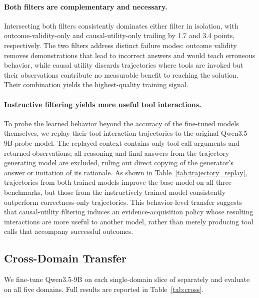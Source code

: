 \paragraph{Both filters are complementary and necessary.}
Intersecting both filters consistently dominates either filter in isolation, with outcome-validity-only and causal-utility-only trailing by 1.7 and 3.4 points, respectively.
The two filters address distinct failure modes: outcome validity removes demonstrations that lead to incorrect answers and would teach erroneous behavior, while causal utility discards trajectories where tools are invoked but their observations contribute no measurable benefit to reaching the solution. Their combination yields the highest-quality training signal.


\paragraph{Instructive filtering yields more useful tool interactions.}
To probe the learned behavior beyond the accuracy of the fine-tuned models themselves, we replay their tool-interaction trajectories to the original Qwen3.5-9B probe model. The replayed context contains only tool call arguments and returned observations; all reasoning and final answers from the trajectory-generating model are excluded, ruling out direct copying of the generator's answer or imitation of its rationale. As shown in Table~\ref{tab:trajectory_replay}, trajectories from both trained models improve the base model on all three benchmarks, but those from the instructively trained model consistently outperform correctness-only trajectories. This behavior-level transfer suggests that causal-utility filtering induces an evidence-acquisition policy whose resulting interactions are more useful to another model, rather than merely producing tool calls that accompany successful outcomes.



\subsection{Cross-Domain Transfer}
\label{sec:cross_domain}

We fine-tune Qwen3.5-9B on each single-domain slice of \dataset{} separately and evaluate on all five domains. Full results are reported in Table~\ref{tab:cross}.

